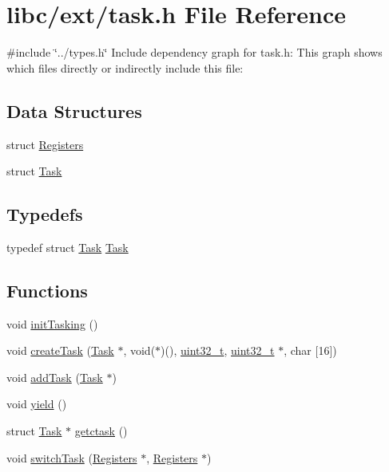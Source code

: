 \hypertarget{a00050}{}\section{libc/ext/task.h File Reference}
\label{a00050}
{\ttfamily \#include \char`\"{}../types.\+h\char`\"{}}\newline
Include dependency graph for task.\+h\+:
This graph shows which files directly or indirectly include this file\+:
\subsection*{Data Structures}
\begin{DoxyCompactItemize}
\item 
struct \hyperlink{a00132}{Registers}
\item 
struct \hyperlink{a00136}{Task}
\end{DoxyCompactItemize}
\subsection*{Typedefs}
\begin{DoxyCompactItemize}
\item 
typedef struct \hyperlink{a00136}{Task} \hyperlink{a00050_a7a90fbdcc84682f027affec67944111b_a7a90fbdcc84682f027affec67944111b}{Task}
\end{DoxyCompactItemize}
\subsection*{Functions}
\begin{DoxyCompactItemize}
\item 
void \hyperlink{a00050_aea945e91746a54801f4763ad264746b9_aea945e91746a54801f4763ad264746b9}{init\+Tasking} ()
\item 
void \hyperlink{a00050_a3abb1d0cc6fd9ea5a5b860f36bc81d6a_a3abb1d0cc6fd9ea5a5b860f36bc81d6a}{create\+Task} (\hyperlink{a00136}{Task} $\ast$, void($\ast$)(), \hyperlink{a00095_a435d1572bf3f880d55459d9805097f62_a435d1572bf3f880d55459d9805097f62}{uint32\+\_\+t}, \hyperlink{a00095_a435d1572bf3f880d55459d9805097f62_a435d1572bf3f880d55459d9805097f62}{uint32\+\_\+t} $\ast$, char \mbox{[}16\mbox{]})
\item 
void \hyperlink{a00050_a077ea59d35297d9fb3fa4675beefbd79_a077ea59d35297d9fb3fa4675beefbd79}{add\+Task} (\hyperlink{a00136}{Task} $\ast$)
\item 
void \hyperlink{a00050_a58c8b2ad0ea491a6642e5e1cbd358c89_a58c8b2ad0ea491a6642e5e1cbd358c89}{yield} ()
\item 
struct \hyperlink{a00136}{Task} $\ast$ \hyperlink{a00050_a5913e9b2190b2b4118ee020721a320e2_a5913e9b2190b2b4118ee020721a320e2}{getctask} ()
\item 
void \hyperlink{a00050_a2425ca34147fccde2d1503332d21c5bd_a2425ca34147fccde2d1503332d21c5bd}{switch\+Task} (\hyperlink{a00132}{Registers} $\ast$, \hyperlink{a00132}{Registers} $\ast$)
\end{DoxyCompactItemize}


